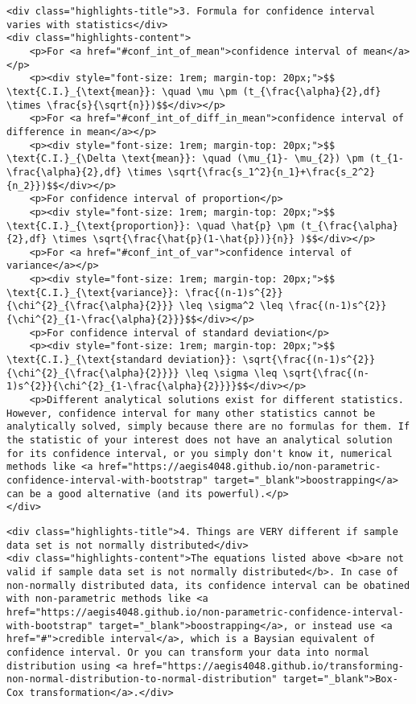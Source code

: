 \documentclass[11pt]{article}
\begin{document}
\hypertarget{key3}{}
\begin{verbatim}
<div class="highlights-title">3. Formula for confidence interval varies with statistics</div>
<div class="highlights-content">
    <p>For <a href="#conf_int_of_mean">confidence interval of mean</a></p>
    <p><div style="font-size: 1rem; margin-top: 20px;">$$ \text{C.I.}_{\text{mean}}: \quad \mu \pm (t_{\frac{\alpha}{2},df} \times \frac{s}{\sqrt{n}})$$</div></p>
    <p>For <a href="#conf_int_of_diff_in_mean">confidence interval of difference in mean</a></p>
    <p><div style="font-size: 1rem; margin-top: 20px;">$$ \text{C.I.}_{\Delta \text{mean}}: \quad (\mu_{1}- \mu_{2}) \pm (t_{1-\frac{\alpha}{2},df} \times \sqrt{\frac{s_1^2}{n_1}+\frac{s_2^2}{n_2}})$$</div></p>    
    <p>For confidence interval of proportion</p>
    <p><div style="font-size: 1rem; margin-top: 20px;">$$ \text{C.I.}_{\text{proportion}}: \quad \hat{p} \pm (t_{\frac{\alpha}{2},df} \times \sqrt{\frac{\hat{p}(1-\hat{p})}{n}} )$$</div></p>
    <p>For <a href="#conf_int_of_var">confidence interval of variance</a></p>
    <p><div style="font-size: 1rem; margin-top: 20px;">$$ \text{C.I.}_{\text{variance}}: \frac{(n-1)s^{2}}{\chi^{2}_{\frac{\alpha}{2}}} \leq \sigma^2 \leq \frac{(n-1)s^{2}}{\chi^{2}_{1-\frac{\alpha}{2}}}$$</div></p>
    <p>For confidence interval of standard deviation</p>
    <p><div style="font-size: 1rem; margin-top: 20px;">$$ \text{C.I.}_{\text{standard deviation}}: \sqrt{\frac{(n-1)s^{2}}{\chi^{2}_{\frac{\alpha}{2}}}} \leq \sigma \leq \sqrt{\frac{(n-1)s^{2}}{\chi^{2}_{1-\frac{\alpha}{2}}}}$$</div></p>
    <p>Different analytical solutions exist for different statistics. However, confidence interval for many other statistics cannot be analytically solved, simply because there are no formulas for them. If the statistic of your interest does not have an analytical solution for its confidence interval, or you simply don't know it, numerical methods like <a href="https://aegis4048.github.io/non-parametric-confidence-interval-with-bootstrap" target="_blank">boostrapping</a> can be a good alternative (and its powerful).</p>
</div>
\end{verbatim}

\hypertarget{key4}{}
\begin{verbatim}
<div class="highlights-title">4. Things are VERY different if sample data set is not normally distributed</div>
<div class="highlights-content">The equations listed above <b>are not valid if sample data set is not normally distributed</b>. In case of non-normally distributed data, its confidence interval can be obatined with non-parametric methods like <a href="https://aegis4048.github.io/non-parametric-confidence-interval-with-bootstrap" target="_blank">boostrapping</a>, or instead use <a href="#">credible interval</a>, which is a Baysian equivalent of confidence interval. Or you can transform your data into normal distribution using <a href="https://aegis4048.github.io/transforming-non-normal-distribution-to-normal-distribution" target="_blank">Box-Cox transformation</a>.</div>
\end{verbatim}
\end{document}
